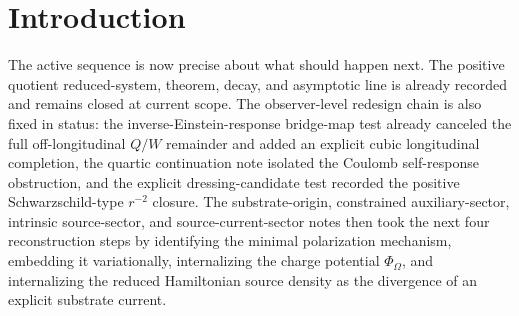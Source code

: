 \documentclass[11pt]{article}
\newcommand{\ProjSub}{P}
\newcommand{\FlowPot}{\Phi_\Omega}
\newcommand{\BalanceField}{\Pi_\Omega}
\newcommand{\AuxPol}{\mathbb K}
\begin{document}
\begin{abstract}
The auxiliary polarization block is kept unchanged. It again yields
\[
\AuxPol_{AB}^{\mathrm{elim}}
=
-2\FlowPot^2U_AU_B
+\frac32\FlowPot^2\ProjSub_{AB},
\]
so the observer pullback again reproduces exactly the same Schwarzschild-type \(r^{-2}\) dressing together with the same \(\mathcal O(r^{-3})\) regular completion. Because the new constitutive layer is slice-wise nonpropagating and reaches the bridge only through the same quartic combination \(\BalanceField=\FlowPot^2\), it does not reopen the lower-order quotient PDE line and preserves the same matter-free/off-longitudinal/cubic/quartic gain package.

The carrier block introduced here should therefore be read only as a disciplined local first-order realization of the chosen reduced current law. This note still does not claim that the constitutive coefficients \((\mathfrak c_I,\mathfrak c_\chi,\mathfrak c_W)\), the carrier basis, or the full enlarged bridge variable have already been derived uniquely from a deeper local substrate curvature action. Its narrower positive result is the one now required by the active sequence: the reduced source-current resolution itself is realized as the elimination of explicit local substrate carrier variables, and everything downstream remains the same.
\end{abstract}

\section{Introduction}

The active sequence is now precise about what should happen next. The positive quotient reduced-system, theorem, decay, and asymptotic line is already recorded and remains closed at current scope. The observer-level redesign chain is also fixed in status: the inverse-Einstein-response bridge-map test already canceled the full off-longitudinal \(Q/W\) remainder and added an explicit cubic longitudinal completion, the quartic continuation note isolated the Coulomb self-response obstruction, and the explicit dressing-candidate test recorded the positive Schwarzschild-type \(r^{-2}\) closure. The substrate-origin, constrained auxiliary-sector, intrinsic source-sector, and source-current-sector notes then took the next four reconstruction steps by identifying the minimal polarization mechanism, embedding it variationally, internalizing the charge potential \(\FlowPot\), and internalizing the reduced Hamiltonian source density as the divergence of an explicit substrate current.
\end{document}

